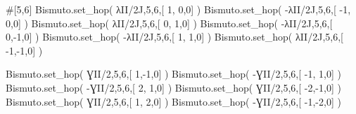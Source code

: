 \documentclass[
  letterpaper,
  DIV=11,
  numbers=noendperiod]{scrreprt}
\newenvironment{Shaded}{\begin{snugshade}}{\end{snugshade}}
\newcommand{\CommentTok}[1]{\textcolor[rgb]{0.37,0.37,0.37}{#1}}
\newcommand{\DecValTok}[1]{\textcolor[rgb]{0.68,0.00,0.00}{#1}}
\newcommand{\NormalTok}[1]{\textcolor[rgb]{0.00,0.23,0.31}{#1}}
\newcommand{\OperatorTok}[1]{\textcolor[rgb]{0.37,0.37,0.37}{#1}}
\newcommand{\OtherTok}[1]{\textcolor[rgb]{0.00,0.23,0.31}{#1}}
\begin{document}
\begin{Shaded}
\begin{Highlighting}[]
\CommentTok{\#[5,6]}
\NormalTok{Bismuto.set\_hop(  λII}\OperatorTok{/}\OtherTok{2J}\NormalTok{,}\DecValTok{5}\NormalTok{,}\DecValTok{6}\NormalTok{,[  }\DecValTok{1}\NormalTok{, }\DecValTok{0}\NormalTok{,}\DecValTok{0}\NormalTok{] ) }
\NormalTok{Bismuto.set\_hop( }\OperatorTok{{-}}\NormalTok{λII}\OperatorTok{/}\OtherTok{2J}\NormalTok{,}\DecValTok{5}\NormalTok{,}\DecValTok{6}\NormalTok{,[ }\OperatorTok{{-}}\DecValTok{1}\NormalTok{, }\DecValTok{0}\NormalTok{,}\DecValTok{0}\NormalTok{] )}
\NormalTok{Bismuto.set\_hop(  λII}\OperatorTok{/}\OtherTok{2J}\NormalTok{,}\DecValTok{5}\NormalTok{,}\DecValTok{6}\NormalTok{,[  }\DecValTok{0}\NormalTok{, }\DecValTok{1}\NormalTok{,}\DecValTok{0}\NormalTok{] ) }
\NormalTok{Bismuto.set\_hop( }\OperatorTok{{-}}\NormalTok{λII}\OperatorTok{/}\OtherTok{2J}\NormalTok{,}\DecValTok{5}\NormalTok{,}\DecValTok{6}\NormalTok{,[  }\DecValTok{0}\NormalTok{,}\OperatorTok{{-}}\DecValTok{1}\NormalTok{,}\DecValTok{0}\NormalTok{] )}
\NormalTok{Bismuto.set\_hop( }\OperatorTok{{-}}\NormalTok{λII}\OperatorTok{/}\OtherTok{2J}\NormalTok{,}\DecValTok{5}\NormalTok{,}\DecValTok{6}\NormalTok{,[  }\DecValTok{1}\NormalTok{, }\DecValTok{1}\NormalTok{,}\DecValTok{0}\NormalTok{] ) }
\NormalTok{Bismuto.set\_hop(  λII}\OperatorTok{/}\OtherTok{2J}\NormalTok{,}\DecValTok{5}\NormalTok{,}\DecValTok{6}\NormalTok{,[ }\OperatorTok{{-}}\DecValTok{1}\NormalTok{,}\OperatorTok{{-}}\DecValTok{1}\NormalTok{,}\DecValTok{0}\NormalTok{] )}

\NormalTok{Bismuto.set\_hop(  ƔII}\OperatorTok{/}\DecValTok{2}\NormalTok{,}\DecValTok{5}\NormalTok{,}\DecValTok{6}\NormalTok{,[  }\DecValTok{1}\NormalTok{,}\OperatorTok{{-}}\DecValTok{1}\NormalTok{,}\DecValTok{0}\NormalTok{] ) }
\NormalTok{Bismuto.set\_hop( }\OperatorTok{{-}}\NormalTok{ƔII}\OperatorTok{/}\DecValTok{2}\NormalTok{,}\DecValTok{5}\NormalTok{,}\DecValTok{6}\NormalTok{,[ }\OperatorTok{{-}}\DecValTok{1}\NormalTok{, }\DecValTok{1}\NormalTok{,}\DecValTok{0}\NormalTok{] )}
\NormalTok{Bismuto.set\_hop( }\OperatorTok{{-}}\NormalTok{ƔII}\OperatorTok{/}\DecValTok{2}\NormalTok{,}\DecValTok{5}\NormalTok{,}\DecValTok{6}\NormalTok{,[  }\DecValTok{2}\NormalTok{, }\DecValTok{1}\NormalTok{,}\DecValTok{0}\NormalTok{] ) }
\NormalTok{Bismuto.set\_hop(  ƔII}\OperatorTok{/}\DecValTok{2}\NormalTok{,}\DecValTok{5}\NormalTok{,}\DecValTok{6}\NormalTok{,[ }\OperatorTok{{-}}\DecValTok{2}\NormalTok{,}\OperatorTok{{-}}\DecValTok{1}\NormalTok{,}\DecValTok{0}\NormalTok{] )}
\NormalTok{Bismuto.set\_hop(  ƔII}\OperatorTok{/}\DecValTok{2}\NormalTok{,}\DecValTok{5}\NormalTok{,}\DecValTok{6}\NormalTok{,[  }\DecValTok{1}\NormalTok{, }\DecValTok{2}\NormalTok{,}\DecValTok{0}\NormalTok{] ) }
\NormalTok{Bismuto.set\_hop( }\OperatorTok{{-}}\NormalTok{ƔII}\OperatorTok{/}\DecValTok{2}\NormalTok{,}\DecValTok{5}\NormalTok{,}\DecValTok{6}\NormalTok{,[ }\OperatorTok{{-}}\DecValTok{1}\NormalTok{,}\OperatorTok{{-}}\DecValTok{2}\NormalTok{,}\DecValTok{0}\NormalTok{] )}
\end{Highlighting}
\end{Shaded}
\end{document}
